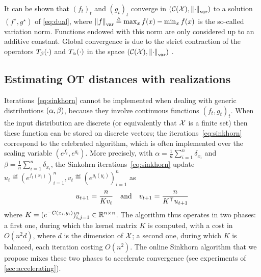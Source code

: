 It can be shown that ${(f_t)}_t$ and ${(g_t)}_t$ converge in $(\mathcal{C}(\mathcal{X}),
\left\| \cdot \right\|_{\text{var}})$ to a solution $(f^\star, g^\star)$ of
\eqref{eq:dual}, where $\left\| f \right\|_{\text{var}} \triangleq \max_x f(x) - \min_x f(x)$
is the so-called variation norm. Functions endowed with this norm are only
considered up to an additive constant.  Global convergence is due to the strict
contraction of the operators $T_{\beta}(\cdot)$ and
$T_{\alpha}(\cdot)$ in the space $(\mathcal{C}(\mathcal{X}), \left\| \cdot \right\|_{\text{var}})$
\citep{peyre2019computational}.

\subsection{Estimating OT distances with realizations}

Iterations~\eqref{eq:sinkhorn} cannot be implemented when dealing with generic distributions $(\alpha,\beta)$, because they involve continuous functions ${(f_t,g_t)}_t$. 
%
When the input distribution are discrete (or equivalently that $\mathcal{X}$ is a finite
set) then these function can be stored on discrete vectors;
the iterations~\eqref{eq:sinkhorn} correspond to the celebrated
\citet{sinkhorn1967concerning} algorithm, which is often implemented over the scaling
variable $(e^{f_t},e^{g_t})$.
%
More precisely, with $\alpha =
\frac{1}{n}\sum_{i=1}^n \delta_{x_i}$ and $\beta = \frac{1}{n} \sum_{i=1}^n
\delta_{x_i}$, the Sinkohrn iterations~\eqref{eq:sinkhorn} update $u_t \eqdef
(e^{f_t(x_i)})_{i=1}^n, v_t \eqdef (e^{g_t(y_i)})_{i=1}^n$ as
\begin{equation*}
	u_{t+1} = \frac{n}{ K v_t }
	\quad \text{and} \quad
	v_{t+1} = \frac{n}{ K^\top u_{t+1} }
\end{equation*}
where $K=(e^{-C(x_i,y_i)})_{i,j=1}^n \in \mathbb{R}^{n \times n}$. The algorithm thus
operates in two phases: a first one, during which the kernel matrix $K$ is
computed, with a cost in $O(n^2 d)$, where $d$ is the dimension of $\mathcal{X}$; a
second one, during which $K$ is balanced, each iteration costing
$O(n^2)$. The online Sinkhorn algorithm that we propose mixes these two phases to accelerate convergence
(see experiments of \autoref{sec:accelerating}).


